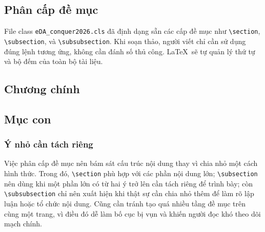 \documentclass[12pt]{eDA_conquer2026}
\begin{document}
\subsection{Phân cấp đề mục}
File class \texttt{eDA\_conquer2026.cls} đã định dạng sẵn các cấp đề mục như \verb|\section|, \verb|\subsection|, và \verb|\subsubsection|. Khi soạn thảo, người viết chỉ cần sử dụng đúng lệnh tương ứng, không cần đánh số thủ công. \LaTeX\ sẽ tự quản lý thứ tự và bộ đếm của toàn bộ tài liệu.

\begin{aivnoutputbox}
\section{Chương chính}
\subsection{Mục con}
\subsubsection{Ý nhỏ cần tách riêng}
\end{aivnoutputbox}

Việc phân cấp đề mục nên bám sát cấu trúc nội dung thay vì chia nhỏ một cách hình thức. Trong đó, \verb|\section| phù hợp với các phần nội dung lớn; \verb|\subsection| nên dùng khi một phần lớn có từ hai ý trở lên cần tách riêng để trình bày; còn \verb|\subsubsection| chỉ nên xuất hiện khi thật sự cần chia nhỏ thêm để làm rõ lập luận hoặc tổ chức nội dung. Cũng cần tránh tạo quá nhiều tầng đề mục trên cùng một trang, vì điều đó dễ làm bố cục bị vụn và khiến người đọc khó theo dõi mạch chính.
\end{document}
